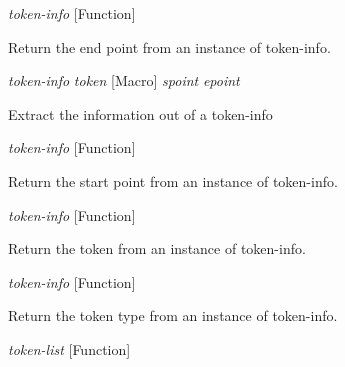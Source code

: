 \vspace{1em}
\noindent
{}
\usebox{\funcname}\emph{token-info}
 \hfill [Function]

\begin{doc-string}
Return the end point from an instance of token-info.
\end{doc-string}

\vspace{1em}
\noindent
{}
\usebox{\funcname}\emph{token-info} \emph{token}
 \hfill [Macro]
\hspace*{\wd\funcname}\emph{spoint} \emph{epoint}
\hspace*{\wd\funcname}

\begin{doc-string}
Extract the information out of a token-info
\end{doc-string}

\vspace{1em}
\noindent
{}
\usebox{\funcname}\emph{token-info}
 \hfill [Function]

\begin{doc-string}
Return the start point from an instance of token-info.
\end{doc-string}

\vspace{1em}
\noindent
{}
\usebox{\funcname}\emph{token-info}
 \hfill [Function]

\begin{doc-string}
Return the token from an instance of token-info.
\end{doc-string}

\vspace{1em}
\noindent
{}
\usebox{\funcname}\emph{token-info}
 \hfill [Function]

\begin{doc-string}
Return the token type from an instance of token-info.
\end{doc-string}

\vspace{1em}
\noindent
{}
\usebox{\funcname}\emph{token-list}
 \hfill [Function]
\hspace*{\wd\funcname}

